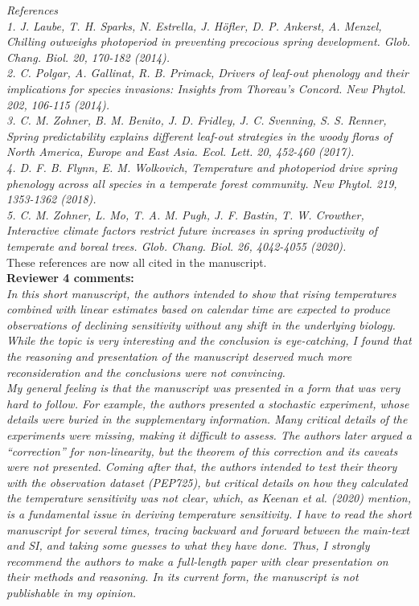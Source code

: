 \documentclass[11pt]{article}
\begin{document}
\emph{References}\\
\emph{1. 	J. Laube, T. H. Sparks, N. Estrella, J. Höfler, D. P. Ankerst, A. Menzel, Chilling outweighs photoperiod in preventing precocious spring development. Glob. Chang. Biol. 20, 170-182 (2014).}\\
\emph{2. 	C. Polgar, A. Gallinat, R. B. Primack, Drivers of leaf-out phenology and their implications for species invasions: Insights from Thoreau's Concord. New Phytol. 202, 106-115 (2014).}\\
\emph{3. 	C. M. Zohner, B. M. Benito, J. D. Fridley, J. C. Svenning, S. S. Renner, Spring predictability explains different leaf-out strategies in the woody floras of North America, Europe and East Asia. Ecol. Lett. 20, 452-460 (2017).}\\
\emph{4. 	D. F. B. Flynn, E. M. Wolkovich, Temperature and photoperiod drive spring phenology across all species in a temperate forest community. New Phytol. 219, 1353-1362 (2018).}\\
\emph{5. 	C. M. Zohner, L. Mo, T. A. M. Pugh, J. F. Bastin, T. W. Crowther, Interactive climate factors restrict future increases in spring productivity of temperate and boreal trees. Glob. Chang. Biol. 26, 4042-4055 (2020).}\\

These references are now all cited in the manuscript.\\

{\bf Reviewer 4 comments:} \\

\emph{In this short manuscript, the authors intended to show that rising temperatures combined with linear estimates based on calendar time are expected to produce observations of declining sensitivity without any shift in the underlying biology. While the topic is very interesting and the conclusion is eye-catching, I found that the reasoning and presentation of the manuscript deserved much more reconsideration and the conclusions were not convincing.}\\

\emph{My general feeling is that the manuscript was presented in a form that was very hard to follow. For example, the authors presented a stochastic experiment, whose details were buried in the supplementary information. Many critical details of the experiments were missing, making it difficult to assess. The authors later argued a ``correction'' for non-linearity, but the theorem of this correction and its caveats were not presented. Coming after that, the authors intended to test their theory with the observation dataset (PEP725), but critical details on how they calculated the temperature sensitivity was not clear, which, as Keenan et al. (2020) mention, is a fundamental issue in deriving temperature sensitivity. I have to read the short manuscript for several times, tracing backward and forward between the main-text and SI, and taking some guesses to what they have done. Thus, I strongly recommend the authors to make a full-length paper with clear presentation on their methods
and reasoning. In its current form, the manuscript is not publishable in my opinion.}\\
\end{document}
